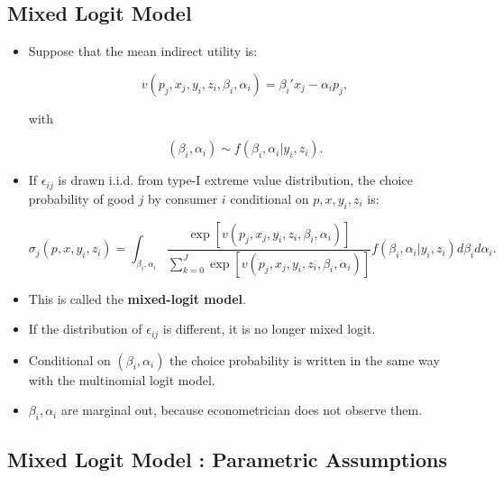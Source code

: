 \documentclass[]{book}
\providecommand{\tightlist}{%
  \setlength{\itemsep}{0pt}\setlength{\parskip}{0pt}}
\begin{document}
\subsection{Mixed Logit Model}\label{mixed-logit-model}

\begin{itemize}
\tightlist
\item
  Suppose that the mean indirect utility is:

  \begin{equation}
  v(p_j, x_j, y_i, z_i, \beta_i, \alpha_i) = \beta_i' x_j - \alpha_i p_j,
  \end{equation}

  with

  \begin{equation}
  (\beta_i, \alpha_i) \sim f(\beta_i, \alpha_i|y_i, z_i).
  \end{equation}
\item
  If \(\epsilon_{ij}\) is drawn i.i.d. from type-I extreme value
  distribution, the choice probability of good \(j\) by consumer \(i\)
  conditional on \(p, x, y_i, z_i\) is:

  \begin{equation}
  \sigma_{j}(p, x, y_i, z_i) = \int_{\beta_i, \alpha_i} \frac{\exp[v(p_j, x_j, y_i, z_i, \beta_i, \alpha_i)]}{\sum_{k = 0}^J \exp[v(p_j, x_j, y_i, z_i, \beta_i, \alpha_i)]} f(\beta_i, \alpha_i|y_i, z_i) d\beta_i d\alpha_i.
  \end{equation}
\item
  This is called the \textbf{mixed-logit model}.
\item
  If the distribution of \(\epsilon_{ij}\) is different, it is no longer
  mixed logit.
\item
  Conditional on \((\beta_i, \alpha_i)\) the choice probability is
  written in the same way with the multinomial logit model.
\item
  \(\beta_i, \alpha_i\) are marginal out, because econometrician does
  not observe them.
\end{itemize}

\subsection{Mixed Logit Model : Parametric
Assumptions}\label{mixed-logit-model-parametric-assumptions}
\end{document}
